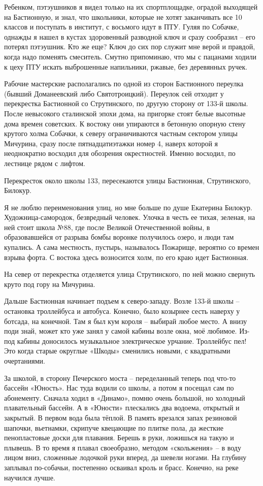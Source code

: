 Ребенком, пэтэушников я видел только на их спортплощадке, оградой выходящей на Бастионную, и знал, что школьники, которые не хотят заканчивать все 10 классов и поступать в институт, с восьмого идут в ПТУ. Гуляя по Собачке, однажды я нашел в кустах здоровенный разводной ключ и сразу сообразил – его потерял пэтэушник. Кто же еще? Ключ до сих пор служит мне верой и правдой, когда надо поменять смеситель. Смутно припоминаю, что мы с пацанами ходили к цеху ПТУ искать выброшенные напильники, ржавые, без деревянных ручек.

Рабочие мастерские располагались по одной из сторон Бастионного переулка (бывший Доманеевский либо Святотроицкий). Переулок сей отходит у перекрестка Бастионной со Струтинского, по другую сторону от 133-й школы. После невысокого сталинской эпохи дома, на пригорке стоят белые высотные дома времен советских. К востоку они упираются в бетонную опорную стену крутого холма Собачки, к северу ограничиваются частным сектором улицы Мичурина, сразу после пятнадцатиэтажки номер 4, наверх которой я неоднократно восходил для обозрения окрестностей. Именно восходил, по лестнице рядом с лифтом.

Перекресток около школы 133, пересекаются улицы Бастионная, Струтинского, Билокур.

Я не люблю переименования улиц, но мне больше по душе Екатерина Билокур. Художница-самородок, безвредный человек. Улочка в честь ее тихая, зеленая, на ней стоит школа №88, где после Великой Отечественной войны, в образовавшейся от разрыва бомбы воронке получилось озеро, и люди там купались. А сама местность, пустырь, называлось Пожарище, вероятно со времен взрыва форта. С востока здесь возносится холм, по его краю идет Бастионная.

На север от перекрестка отделяется улица Струтинского, по ней можно свернуть круто под гору на Мичурина.

Дальше Бастионная начинает подъем к северо-западу. Возле 133-й школы – остановка троллейбуса и автобуса. Конечно, было козырнее сесть наверху у ботсада, на конечной. Там я был кум короля – выбирай любое место. А внизу поди знай, может кто уже занял у самой кабины возле окна, моё любимое. Из-под кабины доносилось музыкальное электрическое урчание. Троллейбус пел! Это когда старые округлые «Шкоды» сменились новыми, с квадратными очертаниями.
 
За школой, в сторону Печерского моста – переделанный теперь под что-то бассейн «Юность». Нас туда водили со школы, а потом я посещал сам по абонементу. Сначала ходил в  «Динамо», помню очень большой, но холодный плавательный бассейн. А в «Юности» плескались два водоема, открытый и закрытый. В первом вода была тёплой. В память врезался запах резиновой шапочки, вьетнамки, скрипуче квецающие по плитке пола, да жесткие пенопластовые доски для плавания. Берешь в руки, ложишься на такую и плывешь. В то время я плавал своеобразно, методом «скольжения» – в воду лицом вниз, сложенные лодочкой руки вперед, да шевели ногами. На глубину заплывал по-собачьи, постепенно осваивал кроль и брасс. Конечно, на реке научился лучше.
 
